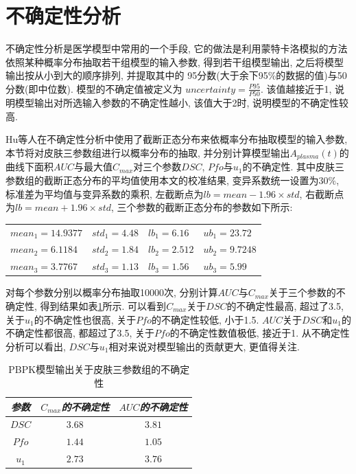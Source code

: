 \documentclass[a4paper,punct=banjiao,twoside]{ctexrep}
\theoremstyle{plain}
\theoremstyle{definition}
\theoremstyle{remark}
\begin{document}
\section{不确定性分析}

不确定性分析是医学模型中常用的一个手段, 它的做法是利用蒙特卡洛模拟的方法依照某种概率分布抽取若干组模型的输入参数, 得到若干组模型输出, 之后将模型输出按从小到大的顺序排列, 并提取其中的
95分数(大于余下95\%的数据的值)与50分数(即中位数)\cite{30}. 模型的不确定值被定义为
$uncertainty = \frac{P95}{P50}$. 该值越接近于1, 说明模型输出对所选输入参数的不确定性越小, 该值大于2时, 说明模型的不确定性较高\cite{30}.

Hu等人\cite{11}在不确定性分析中使用了截断正态分布来依概率分布抽取模型的输入参数, 本节将对皮肤三参数组进行以概率分布的抽取, 并分别计算模型输出$A_{plasma}(t)$的曲线下面积$AUC$与最大值$C_{max}$对三个参数$DSC$, $Pfo$与$u_1$的不确定性.
其中皮肤三参数组的截断正态分布的平均值使用本文的校准结果, 变异系数统一设置为$30\%$, 标准差为平均值与变异系数的乘积, 左截断点为$lb = mean - 1.96\times std$, 右截断点为$lb = mean + 1.96\times std$,
三个参数的截断正态分布的参数如下所示:
\begin{table}[htbp]
  \centering
  \begin{tabular}[t]{|l*{3}{l}|}

    $mean_1 = 14.9377$ &$std_1 = 4.48$ &$lb_1 = 6.16$ &$ub_1 =23.72$  \\ 
  
    $mean_2 = 6.1184$  &$std_2 = 1.84$ &$lb_2 = 2.512$ &$ ub_2 =9.7248$  \\ 
  
    $mean_3 = 3.7767$ &$std_3 = 1.13$  &$lb_3 = 1.56$ &$ub_3 =5.99$ \\ 
    
  \end{tabular}
\end{table}  

对每个参数分别以概率分布抽取10000次, 分别计算$AUC$与$C_{max}$关于三个参数的不确定性, 得到结果如表\ref{tab10}所示. 可以看到$C_{max}$关于$DSC$的不确定性最高, 超过了3.5, 关于$u_1$的不确定性也很高, 关于$Pfo$的不确定性较低, 小于1.5.  $AUC$关于$DSC$和$u_1$的不确定性都很高, 都超过了3.5, 关于$Pfo$的不确定性数值极低, 接近于1. 从不确定性分析可以看出, $DSC$与$u_1$相对来说对模型输出的贡献更大, 更值得关注.

\begin{table}[htbp]
  \centering
  \begin{tabular}[t]{c*{2}{c}}
    \hline
    \textit{参数} &$C_{max}$\textit{的不确定性}  &$AUC$\textit{的不确定性}\\
    \hline
    $DSC$ & $ 3.68$ & $3.81$  \\ 
    
    $Pfo$ & $  1.44$ &$  1.05$   \\ 
   
    $u_1$ & $  2.73$ &$  3.76$   \\ 
    
    \hline
  \end{tabular}
  \caption{\label{tab10}PBPK模型输出关于皮肤三参数组的不确定性} 
\end{table}  
\end{document}
